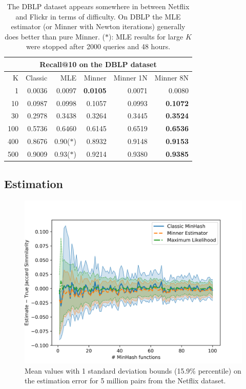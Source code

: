 \begin{table}
\centering
 \begin{tabular}{|r| r r r r r|} 
 \hline
     \multicolumn{6}{|c|}{Recall@10 on the DBLP dataset} \\
 \hline
 K  & Classic & MLE & Minner & Minner 1N & Minner 8N \\
 \hline
    1 & 0.0036 & 0.0097 & \textbf{ 0.0105} & 0.0071 & 0.0080 \\
  10 & 0.0987 & 0.0998 & 0.1057 & 0.0993 & \textbf{ 0.1072} \\
  30 & 0.2978 & 0.3438 & 0.3264 & 0.3445 & \textbf{ 0.3524} \\
 100 & 0.5736 & 0.6460 & 0.6145 & 0.6519 & \textbf{ 0.6536} \\
 400 & 0.8676 & 0.90($\ast$) & 0.8932 & 0.9148 & \textbf{ 0.9153} \\
 500 & 0.9009 & 0.93($\ast$) & 0.9214 & 0.9380 & \textbf{ 0.9385} \\
  \hline
 \end{tabular}
 \caption{The DBLP dataset appears somewhere in between Netflix and Flickr in terms of difficulty.
    On DBLP the MLE estimator (or Minner with Newton iterations) generally does better than pure Minner.
   ($\ast$): MLE results for large $K$ were stopped after 2000 queries and 48 hours.
 }
 \label{tab:dblp}
\end{table}

\subsection{Estimation}\label{sec:estimation}

\begin{figure}
   \centering
   \includegraphics[trim=0 0 35 40,clip,width=\linewidth]{figures/var2}
   \caption{
      Mean values with 1 standard deviation bounds (15.9\% percentile)
      on the estimation error for 5 million pairs from the Netflix dataset.
   }
   \label{fig:var}
\end{figure}

